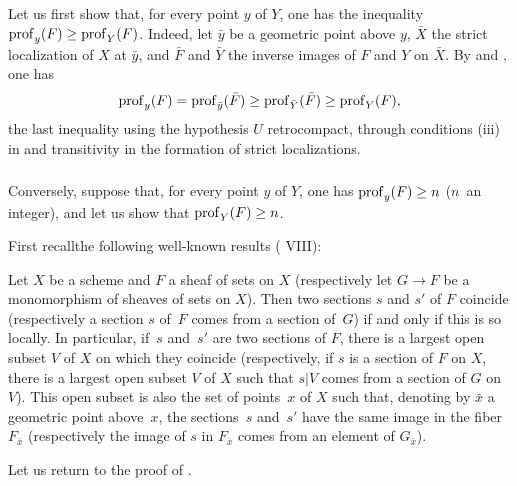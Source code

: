 \subsubsection{} \label{XIV.1.8.1} Let us first show that, for every point $y$ of $Y$, one has the inequality $\prof_y(F)\geq \prof_Y(F)$. Indeed, let $\bar y$ be a geometric point above $y$, $\bar X$ the strict localization of $X$ at $\bar y$, and $\bar F$ and $\bar Y$ the inverse images of $F$ and $Y$ on $\bar X$. By  and , one has
$$
\prof_y(F)=\prof_{\bar y}(\bar F)\geq \prof_{\bar Y}(\bar F)\geq \prof_Y(F),
$$
the last inequality using the hypothesis \og $U$ retrocompact\fg, through conditions \textup{(iii)} in  and transitivity in the formation of strict localizations.

\subsubsection{} \label{XIV.1.8.2}
Conversely, suppose that, for every point $y$ of $Y$, one has $\prof_y(\sisi{Y}{F})\geq n$ ($n$~an integer), and let us show that $\prof_Y(F)\geq n$.

First recall\pageoriginale the following well-known results \textup{( VIII)}:

\begin{subsublemme} \label{XIV.1.8.2.1}
Let $X$ be a scheme and $F$ a sheaf of sets on $X$ (respectively let $G\to F$ be a monomorphism of sheaves of sets on $X$). Then two sections $s$ and $s'$ of $F$ coincide (respectively a section $s$ of~$F$ comes from a section of~$G$) if and only if this is so locally. In particular, if~$s$ and~$s'$ are two sections of $F$, there is a largest open subset $V$ of $X$ on which they coincide (respectively, if $s$ is a section of $F$ on $X$, there is a largest open subset $V$ of $X$ such that $s|V$ comes from a section of $G$ on $V$). This open subset is also the set of points~$x$ of $X$ such that, denoting by $\bar x$ a geometric point above~$x$, the sections~$s$ and~$s'$ have the same image in the fiber $F_{\bar x}$ (respectively the image of $s$ in $F_{\bar x}$ comes from an element of $G_{\bar x}$).
\end{subsublemme}

Let us return to the proof of .


